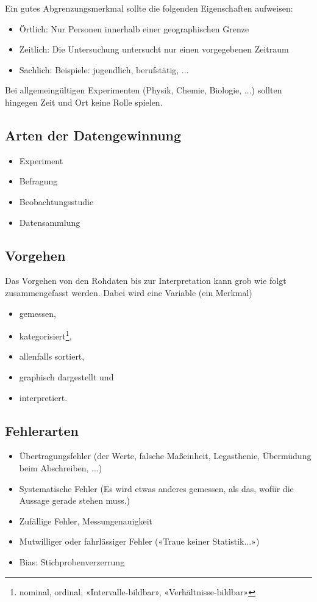 Ein gutes Abgrenzungsmerkmal sollte die folgenden Eigenschaften
aufweisen:
\begin{itemize}
\item Örtlich: Nur Personen innerhalb einer geographischen Grenze
\item Zeitlich: Die Untersuchung untersucht nur einen vorgegebenen
Zeitraum
\item Sachlich: Beispiele: jugendlich, berufstätig, ...
\end{itemize}

Bei allgemeingültigen Experimenten (Physik, Chemie, Biologie, ...)
sollten hingegen Zeit und Ort keine Rolle spielen.


\subsection{Arten der Datengewinnung}
\begin{itemize}
 \item Experiment
 \item Befragung
 \item Beobachtungsstudie
 \item Datensammlung
\end{itemize}

\subsection{Vorgehen}
Das Vorgehen von den Rohdaten bis zur Interpretation kann grob wie folgt zusammengefasst werden. Dabei wird eine Variable (ein Merkmal)
\begin{itemize}
\item gemessen,
\item kategorisiert\footnote{nominal, ordinal, «Intervalle-bildbar»,
    «Verhältnisse-bildbar»},
\item allenfalls sortiert,
\item graphisch dargestellt und
\item interpretiert.
\end{itemize}
\newpage


\subsection{Fehlerarten}
\begin{itemize}

\item Übertragungsfehler (der Werte, \zB falsche Maßeinheit,
  Legasthenie, Übermüdung beim Abschreiben, ...)

\item Systematische Fehler (Es wird etwas anderes gemessen, als das,
  wofür die Aussage gerade stehen muss.)

\item Zufällige Fehler, Messungenauigkeit

\item Mutwilliger oder fahrlässiger Fehler («Traue keiner Statistik...»)

\item Bias: Stichprobenverzerrung
\end{itemize}
\newpage

